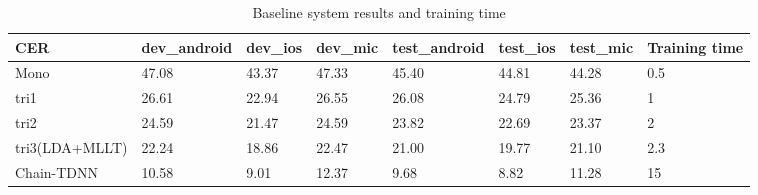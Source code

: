 \documentclass[a4paper]{article}
\begin{document}
\begin{table}[th]
  \caption{Baseline system results and training time}
  \label{tab:base}
  \centering
  \begin{tabular}{ llllllll }
    \toprule
    CER               &  dev\_android           &  dev\_ios           &  dev\_mic           & test\_android            &  test\_ios           &  test\_mic          &  Training time         \\
    \midrule
    Mono        &  47.08                 &  43.37             &  47.33             &  45.40                  &  44.81              &  44.28             &  0.5                   \\
    tri1    &  26.61                 &  22.94             &  26.55             &  26.08                  &  24.79              &  25.36             &  1                     \\
    tri2    &  24.59                 &  21.47             &  24.59             &  23.82                 &  22.69              &  23.37             &  2                     \\
    tri3(LDA+MLLT)          &  22.24                 &  18.86             &  22.47             &  21.00                  &  19.77              &  21.10             &  2.3                   \\
    Chain-TDNN              &  10.58                 &  9.01             &  12.37         &  9.68                  &  8.82             &  11.28              &  15                    \\
    \bottomrule
  \end{tabular}
\end{table}

\end{document}
